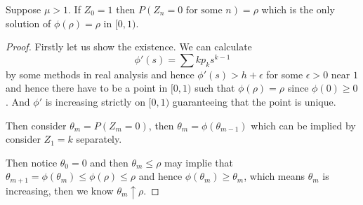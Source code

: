 \documentclass[lang=en, color=blue, ]{elegantbook}
\begin{document}
\begin{theorem}
    Suppose $\mu>1$. If $Z_0 = 1$ then $P(Z_n = 0\text{ for some }n) = \rho$ which is the only solution of $\phi(\rho) = \rho$ in $[0,1)$.    
\end{theorem}
\begin{proof}\par
    Firstly let us show the existence. We can calculate
    \[\phi'(s) = \sum kp_ks^{k-1}\]
    by some methods in real analysis and hence $\phi'(s) > h+\epsilon$ for some $\epsilon > 0$ near $1$ and hence there have to be a point in $[0,1)$ such that $\phi(\rho) = \rho$ since $\phi(0)\geq 0$. And $\phi'$ is increasing strictly on $[0,1)$ guaranteeing that the point is unique.\par
    Then consider $\theta_m = P(Z_m = 0)$, then $\theta_m = \phi(\theta_{m-1})$ which can be implied by consider $Z_1 = k$ separately.\par
    Then notice $\theta_0 = 0$ and then $\theta_m \leq \rho$ may implie that $\theta_{m+1} = \phi(\theta_m) \leq \phi(\rho) \leq \rho$ and hence $\phi(\theta_m) \geq \theta_m$, which means $\theta_m$ is increasing, then we know $\theta_m \uparrow \rho$.
\end{proof}
\end{document}
